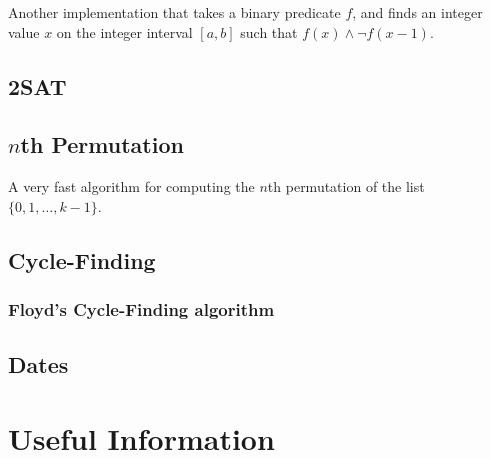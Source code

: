 \documentclass[10pt,a4paper,titlepage]{article}
\begin{document}
Another implementation that takes a binary predicate $f$, and finds an integer value $x$ on the integer interval $[a,b]$ such that $f(x) \land \lnot f(x - 1)$.


\subsection{2SAT}


\subsection{$n$th Permutation}
A very fast algorithm for computing the $n$th permutation of the list $\{0,1,\ldots,k-1\}$.


\subsection{Cycle-Finding}
\subsubsection{Floyd's Cycle-Finding algorithm}


\subsection{Dates}


\section{Useful Information}
\end{document}
